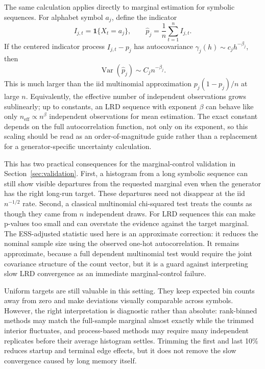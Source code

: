 \documentclass[journal]{IEEEtran}
\begin{document}
The same calculation applies directly to marginal estimation for symbolic
sequences. For alphabet symbol \(a_j\), define the indicator
\begin{equation}
  I_{j,t}=\mathbf{1}\{X_t=a_j\}, \qquad
  \hat p_j = \frac{1}{n}\sum_{t=1}^{n} I_{j,t}.
\end{equation}
If the centered indicator process \(I_{j,t}-p_j\) has autocovariance
\(\gamma_j(h)\sim c_jh^{-\beta_j}\), then
\begin{equation}
  \operatorname{Var}(\hat p_j) \sim C_j n^{-\beta_j}.
\end{equation}
This is much larger than the iid multinomial approximation
\(p_j(1-p_j)/n\) at large \(n\). Equivalently, the effective number of
independent observations grows sublinearly; up to constants, an LRD sequence
with exponent \(\beta\) can behave like only \(n_{\mathrm{eff}}\propto
n^\beta\) independent observations for mean estimation. The exact constant
depends on the full autocorrelation function, not only on its exponent, so this
scaling should be read as an order-of-magnitude guide rather than a replacement
for a generator-specific uncertainty calculation.

This has two practical consequences for the marginal-control validation in
Section~\ref{sec:validation}. First, a histogram from a long symbolic sequence
can still show visible departures from the requested marginal even when the
generator has the right long-run target. These departures need not disappear at
the iid \(n^{-1/2}\) rate. Second, a classical multinomial chi-squared test
treats the counts as though they came from \(n\) independent draws. For LRD
sequences this can make p-values too small and can overstate the evidence
against the target marginal. The ESS-adjusted statistic used here is an approximate
correction: it reduces the nominal sample size using the observed one-hot
autocorrelation. It remains approximate, because a full dependent multinomial
test would require the joint covariance structure of the count vector, but it is
a guard against interpreting slow LRD convergence as an immediate
marginal-control failure.

Uniform targets are still valuable in this setting. They keep expected bin
counts away from zero and make deviations visually comparable across symbols.
However, the right interpretation is diagnostic rather than absolute: rank-binned
methods may match the full-sample marginal almost exactly while the trimmed
interior fluctuates, and process-based methods may require many independent
replicates before their average histogram settles. Trimming the first and last
10\% reduces startup and terminal edge effects, but it does not remove the slow
convergence caused by long memory itself.
\end{document}
